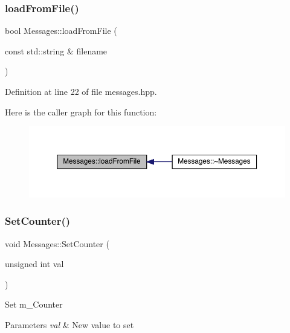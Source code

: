 \mbox{\label{class_messages_a4263549c3f5c27b68279adbd7bcbcc30}} 
\subsubsection{\texorpdfstring{load\+From\+File()}{loadFromFile()}}
{\footnotesize\ttfamily bool Messages\+::load\+From\+File (\begin{DoxyParamCaption}\item[{const std\+::string \&}]{filename }\end{DoxyParamCaption})\hspace{0.3cm}{\ttfamily [inline]}}



Definition at line 22 of file messages.\+hpp.

Here is the caller graph for this function\+:\nopagebreak
\begin{figure}[H]
\begin{center}
\leavevmode
\includegraphics[width=350pt]{class_messages_a4263549c3f5c27b68279adbd7bcbcc30_icgraph}
\end{center}
\end{figure}
\mbox{\label{class_messages_aecaad70bba58fd8d1a5640cb04088a2c}} 
\subsubsection{\texorpdfstring{Set\+Counter()}{SetCounter()}}
{\footnotesize\ttfamily void Messages\+::\+Set\+Counter (\begin{DoxyParamCaption}\item[{unsigned int}]{val }\end{DoxyParamCaption})\hspace{0.3cm}{\ttfamily [inline]}}

Set m\+\_\+\+Counter 
\begin{DoxyParams}{Parameters}
{\em val} & New value to set \\
\hline
\end{DoxyParams}


